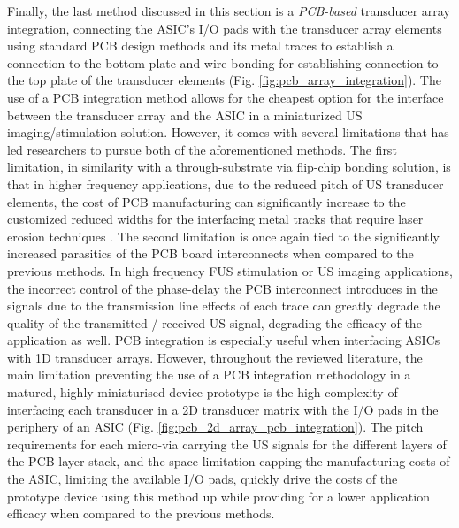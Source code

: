 \par
Finally, the last method discussed in this section is a \textit{PCB-based} transducer array integration, connecting the ASIC's I/O pads with the transducer array elements using standard PCB design methods and its metal traces to establish a connection to the bottom plate  and wire-bonding for establishing connection to the top plate of the transducer elements (Fig. \ref{fig:pcb_array_integration}). 
The use of a PCB integration method allows for the cheapest option for the interface between the transducer array and the ASIC in a miniaturized US imaging/stimulation solution. However, it comes with several limitations that has led researchers to pursue both of the aforementioned methods. The first limitation, in similarity with a through-substrate via flip-chip bonding solution, is that in higher frequency applications, due to the reduced pitch of US transducer elements, the cost of PCB manufacturing can significantly increase to the customized reduced widths for the interfacing metal tracks that require laser erosion techniques \cite{}. The second limitation is once again tied to the significantly increased parasitics of the PCB board interconnects when compared to the previous methods. In high frequency FUS stimulation or US imaging applications, the incorrect control of the phase-delay the PCB interconnect introduces in the signals due to the transmission line effects of each trace can greatly degrade the quality of the transmitted / received US signal, degrading the efficacy of the application as well. PCB integration is especially useful when interfacing ASICs with 1D transducer arrays. However, throughout the reviewed literature, the main limitation preventing the use of a PCB integration methodology in a matured, highly miniaturised device prototype is the high complexity of interfacing each transducer in a 2D transducer matrix with the I/O pads in the periphery of an ASIC (Fig. \ref{fig:pcb_2d_array_pcb_integration}). The pitch requirements for each micro-via carrying the US signals for the different layers of the PCB layer stack, and the space limitation capping the manufacturing costs of the ASIC, limiting the available I/O pads, quickly drive the costs of the prototype device using this method up while providing for a lower application efficacy when compared to the previous methods. 
\par
